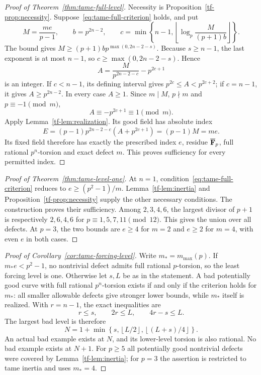 \begin{proof}[Proof of Theorem~\ref{thm:tame-full-level}]
Necessity is Proposition~\ref{tf-prop:necessity}. Suppose~\eqref{eq:tame-full-criterion} holds, and put
\[
 M=\frac{me}{p-1},\qquad b=p^{2n-2},\qquad
 c=\min\left\{n-1,\left\lfloor\log_p\frac{M}{(p+1)b}\right\rfloor\right\}.
\]
The bound gives $M\ge(p+1)bp^{\max(0,2n-2-s)}$. Because $s\ge n-1$, the last exponent is at most $n-1$, so
$c\ge\max(0,2n-2-s)$. Hence
\begin{equation}\label{tf-eq:choose-A}
 A=\frac{M}{p^{2n-2-c}}-p^{2c+1}
\end{equation}
is an integer. If $c<n-1$, its defining interval gives
$p^{2c}\le A<p^{2c+2}$; if $c=n-1$, it gives $A\ge p^{2n-2}$. In every case $A\ge1$. Since $m\mid M$, $p\nmid m$ and $p\equiv-1\pmod m$,
\[
 A\equiv-p^{2c+1}\equiv1\pmod m.
\]
Apply Lemma~\ref{tf-lem:realization}. Its good field has absolute index
\[
 E=(p-1)p^{2n-2-c}(A+p^{2c+1})=(p-1)M=me.
\]
Its fixed field therefore has exactly the prescribed index $e$, residue $\overline{\mathbf F}_p$, full rational $p^n$-torsion and exact defect $m$. This proves sufficiency for every permitted index.
\end{proof}

\begin{proof}[Proof of Theorem~\ref{thm:tame-level-one}]
At $n=1$, condition~\eqref{eq:tame-full-criterion} reduces to $e\ge(p^2-1)/m$. Lemma~\ref{tf-lem:inertia} and Proposition~\ref{tf-prop:necessity} supply the other necessary conditions. The construction proves their sufficiency. Among $2,3,4,6$, the largest divisor of $p+1$ is respectively $2,6,4,6$ for $p\equiv1,5,7,11\pmod{12}$. This gives the union over all defects. At $p=3$, the two bounds are $e\ge4$ for $m=2$ and $e\ge2$ for $m=4$, with even $e$ in both cases.
\end{proof}

\begin{proof}[Proof of Corollary~\ref{cor:tame-forcing-level}]
Write $m_*=m_{\max}(p)$. If $m_*e<p^2-1$, no nontrivial defect admits full rational $p$-torsion, so the least forcing level is one. Otherwise let $s,L$ be as in the statement. A bad potentially good curve with full rational $p^n$-torsion exists if and only if the criterion holds for $m_*$: all smaller allowable defects give stronger lower bounds, while $m_*$ itself is realized. With $r=n-1$, the exact inequalities are
\[
 r\le s,\qquad 2r\le L,\qquad4r-s\le L.
\]
The largest bad level is therefore
\[
 N=1+\min\left\{s,\left\lfloor L/2\right\rfloor,
                       \left\lfloor(L+s)/4\right\rfloor\right\}.
\]
An actual bad example exists at $N$, and its lower-level torsion is also rational. No bad example exists at $N+1$. For $p\ge5$ all potentially good nontrivial defects were covered by Lemma~\ref{tf-lem:inertia}; for $p=3$ the assertion is restricted to tame inertia and uses $m_*=4$.
\end{proof}

